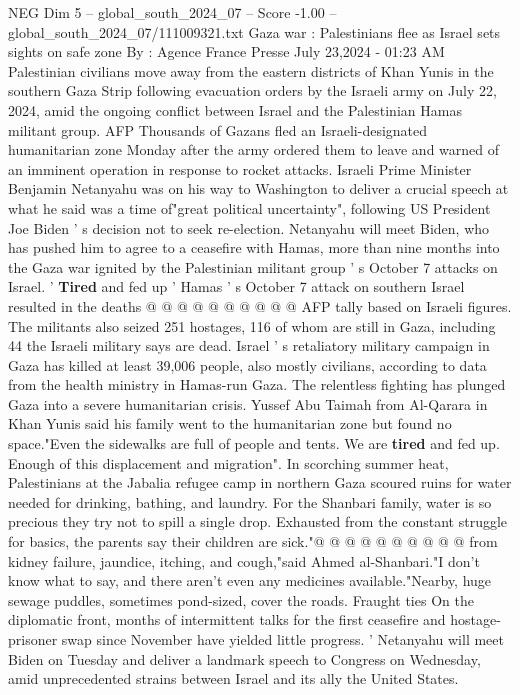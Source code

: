 \begin{textsample}{NEG Dim 5 – global\_south\_2024\_07 – Score -1.00 – global\_south\_2024\_07/111009321.txt}  \label{ex:f5_neg_293}
Gaza war : Palestinians flee as Israel sets sights on safe zone By : Agence France Presse July 23,2024 - 01:23 AM Palestinian civilians move away from the eastern districts of Khan Yunis in the southern Gaza Strip following evacuation orders by the Israeli army on July 22, 2024, amid the ongoing conflict between Israel and the Palestinian Hamas militant group.
AFP Thousands of Gazans fled an Israeli-designated humanitarian zone Monday after the army ordered them to leave and warned of an imminent operation in response to rocket attacks.
Israeli Prime Minister Benjamin Netanyahu was on his way to Washington to deliver a crucial speech at what he said was a time of"great political uncertainty", following US President Joe Biden ' s decision not to seek re-election.
Netanyahu will meet Biden, who has pushed him to agree to a ceasefire with Hamas, more than nine months into the Gaza war ignited by the Palestinian militant group ' s October 7 attacks on Israel. ' \textbf{Tired} and fed up ' Hamas ' s October 7 attack on southern Israel resulted in the deaths @ @ @ @ @ @ @ @ @ @ AFP tally based on Israeli figures.
The militants also seized 251 hostages, 116 of whom are still in Gaza, including 44 the Israeli military says are dead.
Israel ' s retaliatory military campaign in Gaza has killed at least 39,006 people, also mostly civilians, according to data from the health ministry in Hamas-run Gaza.
The relentless fighting has plunged Gaza into a severe humanitarian crisis.
Yussef Abu Taimah from Al-Qarara in Khan Yunis said his family went to the humanitarian zone but found no space."Even the sidewalks are full of people and tents.
We are \textbf{tired} and fed up.
Enough of this displacement and migration".
In scorching summer heat, Palestinians at the Jabalia refugee camp in northern Gaza scoured ruins for water needed for drinking, bathing, and laundry.
For the Shanbari family, water is so precious they try not to spill a single drop.
Exhausted from the constant struggle for basics, the parents say their children are sick."@ @ @ @ @ @ @ @ @ @ from kidney failure, jaundice, itching, and cough,"said Ahmed al-Shanbari."I don't know what to say, and there aren't even any medicines available."Nearby, huge sewage puddles, sometimes pond-sized, cover the roads.
Fraught ties On the diplomatic front, months of intermittent talks for the first ceasefire and hostage-prisoner swap since November have yielded little progress. ' Netanyahu will meet Biden on Tuesday and deliver a landmark speech to Congress on Wednesday, amid unprecedented strains between Israel and its ally the United States.

\end{textsample}
